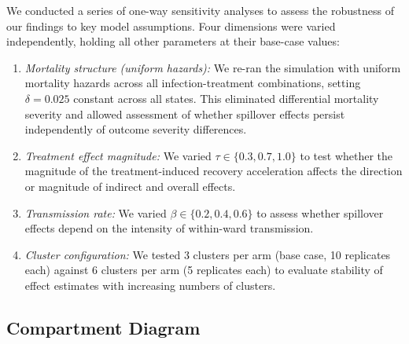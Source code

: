 \documentclass[preprint,11pt]{elsarticle}
\begin{document}
We conducted a series of one-way sensitivity analyses to assess the robustness of our findings to key model assumptions. Four dimensions were varied independently, holding all other parameters at their base-case values:

\begin{enumerate}
  \item \textit{Mortality structure (uniform hazards):} We re-ran the simulation with uniform mortality hazards across all infection-treatment combinations, setting $\delta = 0.025$ constant across all states. This eliminated differential mortality severity and allowed assessment of whether spillover effects persist independently of outcome severity differences.

  \item \textit{Treatment effect magnitude:} We varied $\tau \in \{0.3, 0.7, 1.0\}$ to test whether the magnitude of the treatment-induced recovery acceleration affects the direction or magnitude of indirect and overall effects.

  \item \textit{Transmission rate:} We varied $\beta \in \{0.2, 0.4, 0.6\}$ to assess whether spillover effects depend on the intensity of within-ward transmission.

  \item \textit{Cluster configuration:} We tested 3 clusters per arm (base case, 10 replicates each) against 6 clusters per arm (5 replicates each) to evaluate stability of effect estimates with increasing numbers of clusters.
\end{enumerate}

\subsection{Compartment Diagram}
\end{document}

